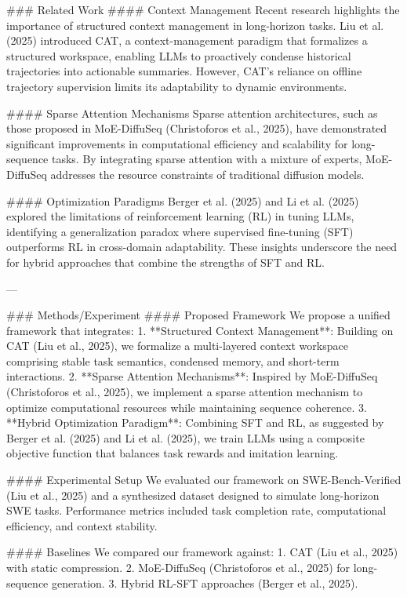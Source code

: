 ### Related Work  
#### Context Management  
Recent research highlights the importance of structured context management in long-horizon tasks. Liu et al. (2025) introduced CAT, a context-management paradigm that formalizes a structured workspace, enabling LLMs to proactively condense historical trajectories into actionable summaries. However, CAT's reliance on offline trajectory supervision limits its adaptability to dynamic environments.

#### Sparse Attention Mechanisms  
Sparse attention architectures, such as those proposed in MoE-DiffuSeq (Christoforos et al., 2025), have demonstrated significant improvements in computational efficiency and scalability for long-sequence tasks. By integrating sparse attention with a mixture of experts, MoE-DiffuSeq addresses the resource constraints of traditional diffusion models.

#### Optimization Paradigms  
Berger et al. (2025) and Li et al. (2025) explored the limitations of reinforcement learning (RL) in tuning LLMs, identifying a generalization paradox where supervised fine-tuning (SFT) outperforms RL in cross-domain adaptability. These insights underscore the need for hybrid approaches that combine the strengths of SFT and RL.

---

### Methods/Experiment  
#### Proposed Framework  
We propose a unified framework that integrates:  
1. **Structured Context Management**: Building on CAT (Liu et al., 2025), we formalize a multi-layered context workspace comprising stable task semantics, condensed memory, and short-term interactions.  
2. **Sparse Attention Mechanisms**: Inspired by MoE-DiffuSeq (Christoforos et al., 2025), we implement a sparse attention mechanism to optimize computational resources while maintaining sequence coherence.  
3. **Hybrid Optimization Paradigm**: Combining SFT and RL, as suggested by Berger et al. (2025) and Li et al. (2025), we train LLMs using a composite objective function that balances task rewards and imitation learning.

#### Experimental Setup  
We evaluated our framework on SWE-Bench-Verified (Liu et al., 2025) and a synthesized dataset designed to simulate long-horizon SWE tasks. Performance metrics included task completion rate, computational efficiency, and context stability.

#### Baselines  
We compared our framework against:  
1. CAT (Liu et al., 2025) with static compression.  
2. MoE-DiffuSeq (Christoforos et al., 2025) for long-sequence generation.  
3. Hybrid RL-SFT approaches (Berger et al., 2025).  


